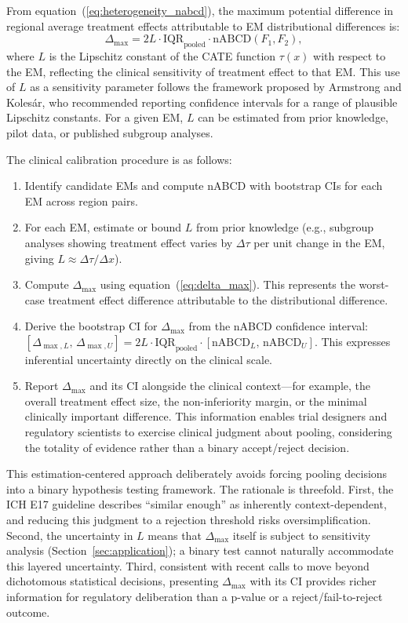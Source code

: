 \documentclass[AMA,Times1COL]{WileyNJDv5}
\begin{document}
From equation~(\ref{eq:heterogeneity_nabcd}), the maximum potential difference in regional average treatment effects attributable to EM distributional differences is:
\begin{equation}
\Delta_{\max} = 2L \cdot \text{IQR}_{\text{pooled}} \cdot \text{nABCD}(F_1, F_2),
\label{eq:delta_max}
\end{equation}
where $L$ is the Lipschitz constant of the CATE function $\tau(x)$ with respect to the EM, reflecting the clinical sensitivity of treatment effect to that EM. This use of $L$ as a sensitivity parameter follows the framework proposed by Armstrong and Koles\'{a}r,\cite{armstrong2021} who recommended reporting confidence intervals for a range of plausible Lipschitz constants. For a given EM, $L$ can be estimated from prior knowledge, pilot data, or published subgroup analyses.

The clinical calibration procedure is as follows:
\begin{enumerate}[1.]
\item Identify candidate EMs and compute nABCD with bootstrap CIs for each EM across region pairs.
\item For each EM, estimate or bound $L$ from prior knowledge (e.g., subgroup analyses showing treatment effect varies by $\Delta\tau$ per unit change in the EM, giving $L \approx \Delta\tau / \Delta x$).
\item Compute $\Delta_{\max}$ using equation~(\ref{eq:delta_max}). This represents the worst-case treatment effect difference attributable to the distributional difference.
\item Derive the bootstrap CI for $\Delta_{\max}$ from the nABCD confidence interval: $[\Delta_{\max,L},\, \Delta_{\max,U}] = 2L \cdot \text{IQR}_{\text{pooled}} \cdot [\text{nABCD}_{L},\, \text{nABCD}_{U}]$. This expresses inferential uncertainty directly on the clinical scale.
\item Report $\Delta_{\max}$ and its CI alongside the clinical context---for example, the overall treatment effect size, the non-inferiority margin, or the minimal clinically important difference. This information enables trial designers and regulatory scientists to exercise clinical judgment about pooling, considering the totality of evidence rather than a binary accept/reject decision.
\end{enumerate}

This estimation-centered approach deliberately avoids forcing pooling decisions into a binary hypothesis testing framework. The rationale is threefold. First, the ICH E17 guideline describes ``similar enough'' as inherently context-dependent, and reducing this judgment to a rejection threshold risks oversimplification. Second, the uncertainty in $L$ means that $\Delta_{\max}$ itself is subject to sensitivity analysis (Section~\ref{sec:application}); a binary test cannot naturally accommodate this layered uncertainty. Third, consistent with recent calls to move beyond dichotomous statistical decisions,\cite{wasserstein2016} presenting $\Delta_{\max}$ with its CI provides richer information for regulatory deliberation than a p-value or a reject/fail-to-reject outcome.
\end{document}

